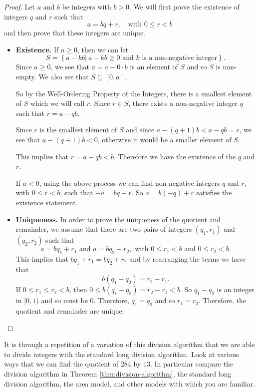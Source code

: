 \documentclass[
]{book}
\theoremstyle{definition}
\theoremstyle{definition}
\theoremstyle{definition}
\theoremstyle{definition}
\theoremstyle{remark}
\begin{document}
\begin{proof}

Let \(a\) and \(b\) be integers with \(b>0\). We will first prove the existence of integers \(q\) and \(r\) such that \[a=bq+r, \quad \mbox{with } 0\leq r <b\] and then prove that these integers are unique.

\begin{itemize}
\item
  \textbf{Existence.} If \(a\geq 0\), then we can let
  \[S= \left\{ a-kb \vert  \: a-kb\geq 0 \mbox{ and $k$ is a non-negative integer}\right\}.\]
  Since \(a\geq 0\), we see that \(a=a-0\cdot b\) is an element of \(S\) and so \(S\) is non-empty. We also see that \(S \subseteq [0,a]\).

  So by the Well-Ordering Property of the Integers, there is a smallest element of \(S\) which we will call \(r\). Since \(r\in S\), there exists a non-negative integer \(q\) such that \(r=a-qb\).

  Since \(r\) is the smallest element of \(S\) and since \(a-(q+1)b<a-qb=r\), we see that \(a-(q+1)b<0\), otherwise it would be a smaller element of \(S\).

  This implies that \(r=a-qb<b\). Therefore we have the existence of the \(q\) and \(r\).

  If \(a<0\), using the above process we can find non-negative integers \(q\) and \(r\), with \(0\leq r<b\), such that \(-a=bq+r\). So \(a=b(-q)+r\) satisfies the existence statement.
\item
  \textbf{Uniqueness.} In order to prove the uniqueness of the quotient and remainder, we assume that there are two pairs of integers \((q_1,r_1)\) and \((q_2,r_2)\) such that
  \[a= b q_1 + r_1 \mbox{ and } a= b q_2 + r_2, \mbox{ with } 0\leq r_1<b \mbox{ and } 0\leq r_2 <b.\]
  This implies that \(b q_1 + r_1 = b q_2 + r_2\) and by rearranging the terms we have that \[b (q_1 - q_2) = r_2-r_1.\] If \(0 \leq r_1 \leq r_2<b\), then \(0 \leq b(q_1-q_2)=r_2-r_1<b\). So \(q_1-q_2\) is an integer in \([0,1)\) and so must be \(0\). Therefore, \(q_1=q_2\) and so \(r_1=r_2\). Therefore, the quotient and remainder are unique.
\end{itemize}

\end{proof}

It is through a repetition of a variation of this division algorithm that we are able to divide integers with the standard long division algorithm. Look at various ways that we can find the quotient of \(284\) by \(13\). In particular compare the division algorithm in Theorem \ref{thm:division-algorithm}, the standard long division algorithm, the area model, and other models with which you are familiar.
\end{document}
